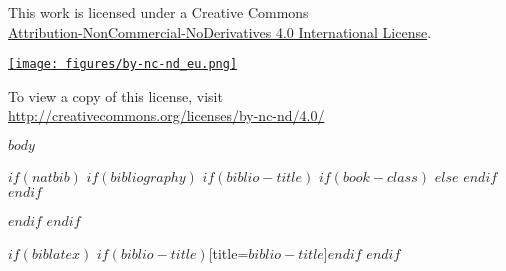 \documentclass[12pt,a4paper, twoside=false]{scrartcl}
\begin{document}
\begin{titlepage}
    \begin{center}
          This work is licensed under a Creative Commons \\
          \href{http://creativecommons.org/licenses/by-nc-nd/4.0/}{Attribution-NonCommercial-NoDerivatives 4.0 International License}.\\
      \end{center}
      \begin{center}
        \href{http://creativecommons.org/licenses/by-nc-nd/4.0/}{\texttt{[image: figures/by-nc-nd\_eu.png]}}
      \end{center}
      \begin{center}
          To view a copy of this license, visit\\
          \href{http://creativecommons.org/licenses/by-nc-nd/4.0/}{http://creativecommons.org/licenses/by-nc-nd/4.0/}\\
    \end{center}

\end{titlepage}




$body$

$if(natbib)$
$if(bibliography)$
$if(biblio-title)$
$if(book-class)$
\renewcommand\bibname{$biblio-title$}
$else$
\renewcommand\refname{$biblio-title$}
$endif$
$endif$

$endif$
$endif$

$if(biblatex)$
\printbibliography$if(biblio-title)$[title=$biblio-title$]$endif$
$endif$
\end{document}
